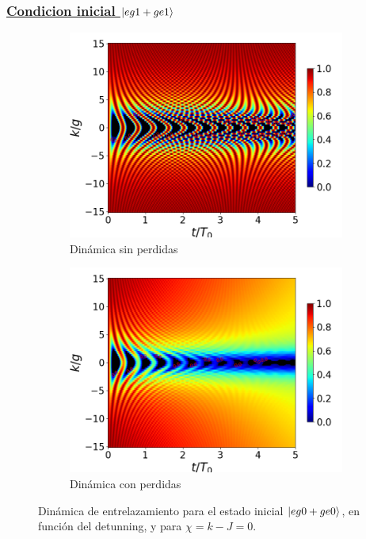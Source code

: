 \subsubsection{\underline{Condicion inicial $\ket{eg1+ge1}$}}
\begin{figure}[h]
    \centering
    \begin{subfigure}{0.49\textwidth}
        \includegraphics[width=\textwidth]{figuras/ch4/concu/k/eg1+ge1 d=0.0g x=0.0g J=15.0g gamma=0.25g concu k uni.png}
        \caption{Dinámica sin perdidas}
        \label{fig4:concu k 1 uni}
    \end{subfigure}
    \hfill
    \begin{subfigure}{0.49\textwidth}
        \includegraphics[width=\textwidth]{figuras/ch4/concu/k/eg1+ge1 d=0.0g x=0.0g J=15.0g gamma=0.25g concu k dis.png}
        \caption{Dinámica con perdidas}
        \label{fig4:concu k 1 dis}
    \end{subfigure}
    \caption{Dinámica de entrelazamiento para el estado inicial $\ket{eg0+ge0}$, en función del detunning, y para $\chi=k-J=0$.}
    \label{fig4:concu k 1}
\end{figure}

